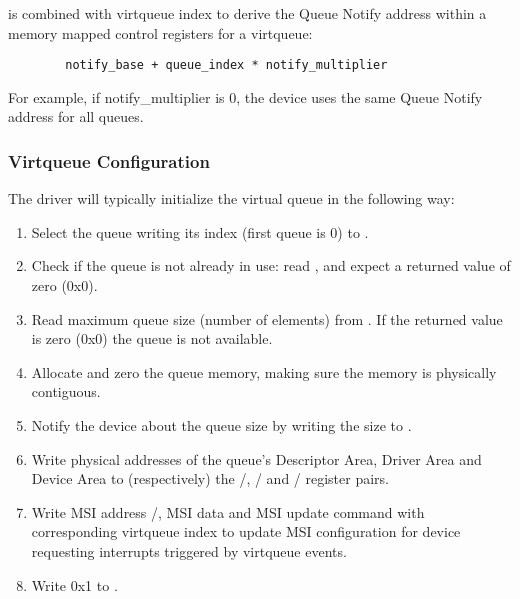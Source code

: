 is combined with virtqueue index to derive the Queue Notify address
within a memory mapped control registers for a virtqueue:

\begin{lstlisting}
        notify_base + queue_index * notify_multiplier
\end{lstlisting}

\begin{note}
For example, if notify_multiplier is 0, the device uses the same Queue Notify address for all
queues.
\end{note}

\subsubsection{Virtqueue Configuration}\label{sec:Virtio Transport Options / Virtio Over MMIO / MMIO-specific Initialization And Device Operation / Virtqueue Configuration}

The driver will typically initialize the virtual queue in the following way:

\begin{enumerate}
\item Select the queue writing its index (first queue is 0) to
   .

\item Check if the queue is not already in use: read ,
   and expect a returned value of zero (0x0).

\item Read maximum queue size (number of elements) from
   . If the returned value is zero (0x0) the
   queue is not available.

\item Allocate and zero the queue memory, making sure the memory
   is physically contiguous.

\item Notify the device about the queue size by writing the size to
   .

\item Write physical addresses of the queue's Descriptor Area,
   Driver Area and Device Area to (respectively) the
   /,
   / and
   / register pairs.

\item Write MSI address /,
MSI data  and MSI update command  with corresponding
virtqueue index to update
MSI configuration for device requesting interrupts triggered by
virtqueue events.

\item Write 0x1 to .
\end{enumerate}

